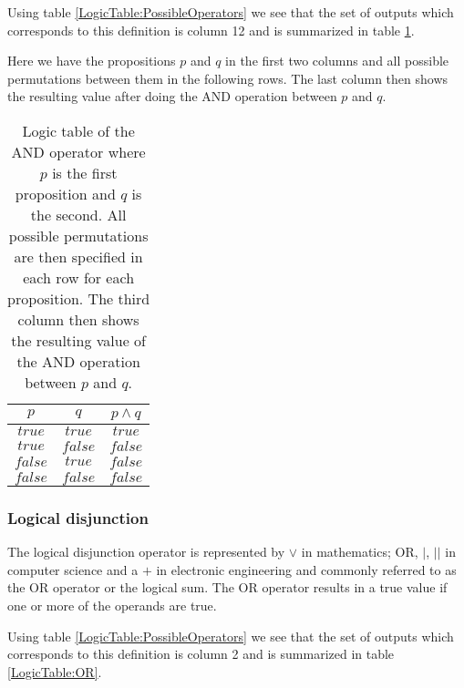                 Using table \ref{LogicTable:PossibleOperators} we see that the set of outputs which corresponds to this definition is column 12 and is summarized in table \ref{LogicTable:AND}. 
                
                Here we have the propositions $p$ and $q$ in the first two columns and all possible permutations between them in the following rows. The last column then shows the resulting value after doing the AND operation between $p$ and $q$. 
                
                \begin{table}[h!]
                    \centering
                    \begin{tabular}{|c|c|c|}
                    	\hline
                    	  $p$   &   $q$   & $p \wedge q$ \\ \hline
                    	$true$  & $true$  &    $true$    \\ \hline
                    	$true$  & $false$ &   $false$    \\ \hline
                    	$false$ & $true$  &   $false$    \\ \hline
                    	$false$ & $false$ &   $false$    \\ \hline
                    \end{tabular}
                    \caption{Logic table of the AND operator where $p$ is the first proposition and $q$ is the second. All possible permutations are then specified in each row for each proposition. The third column then shows the resulting value of the AND operation between $p$ and $q$.}
                    \label{LogicTable:AND}
                \end{table}
            
            \subsubsection{Logical disjunction}
            
                The logical disjunction operator is represented by $\vee$ in mathematics; OR, $\vert$, $\vert \vert$  in computer science and a $+$ in electronic engineering and commonly referred to as the OR operator or the logical sum. The OR operator results in a true value if one or more of the operands are true.
                
                Using table \ref{LogicTable:PossibleOperators} we see that the set of outputs which corresponds to this definition is column 2 and is summarized in table \ref{LogicTable:OR}. 
                
